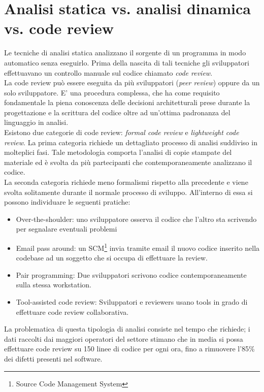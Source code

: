 \section{Analisi statica vs. analisi dinamica vs. code review}
Le tecniche di analisi statica analizzano il sorgente di un programma in modo automatico senza eseguirlo. Prima della nascita di tali tecniche gli sviluppatori effettuavano un controllo manuale sul codice chiamato \emph{code review}.\\

La code review può essere eseguita da più sviluppatori (\emph{peer review}) oppure da un solo sviluppatore. E' una procedura complessa, che ha come requisito fondamentale la piena conoscenza delle decisioni architetturali prese durante la progettazione e la scrittura del codice oltre ad un'ottima padronanza del linguaggio in analisi. \\
Esistono due categorie di code review: \emph{formal code review} e \emph{lightweight code review}. La prima categoria richiede un dettagliato processo di analisi suddiviso in molteplici fasi. Tale metodologia comporta l'analisi di copie stampate del materiale ed è svolta da più partecipanti che contemporaneamente analizzano il codice.\\
La seconda categoria richiede meno formalismi rispetto alla precedente e viene svolta solitamente durante il normale processo di sviluppo. All'interno di essa si possono individuare le seguenti pratiche:
\begin{itemize}
\item Over-the-shoulder: uno sviluppatore osserva il codice che l'altro sta scrivendo per segnalare eventuali problemi
\item Email pass around: un SCM\footnote{Source Code Management System} invia tramite email il nuovo codice inserito nella codebase ad un soggetto che si occupa di effettuare la review.
\item Pair programming: Due sviluppatori scrivono codice contemporaneamente sulla stessa workstation. 
\item Tool-assisted code review: Sviluppatori e reviewers usano tools in grado di effettuare code review collaborativa.
\end{itemize}
La problematica di questa tipologia di analisi consiste nel tempo che richiede; i dati raccolti dai maggiori operatori del settore stimano che in media si possa effettuare code review su 150 linee di codice per ogni ora, fino a rimuovere l'85\% dei difetti presenti nel software.

